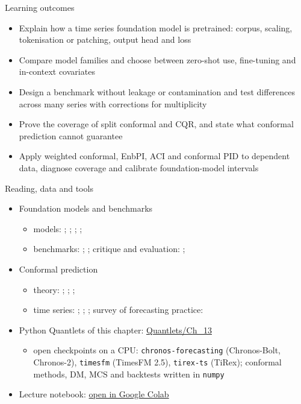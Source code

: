 \begin{frame}{Learning outcomes}
\itemsize{\small}
\begin{itemize}
    \item Explain how a time series foundation model is pretrained: corpus, scaling, tokenisation or patching, output head and loss
    \item Compare model families and choose between zero-shot use, fine-tuning and in-context covariates
    \item Design a benchmark without leakage or contamination and test differences across many series with corrections for multiplicity
    \item Prove the coverage of split conformal and CQR, and state what conformal prediction cannot guarantee
    \item Apply weighted conformal, EnbPI, ACI and conformal PID to dependent data, diagnose coverage and calibrate foundation-model intervals
\end{itemize}
\end{frame}

\begin{frame}{Reading, data and tools}
\itemsize{\small}
\begin{itemize}
    \item Foundation models and benchmarks
    \begin{itemize}
        \item models: ; ; ; ; 
        \item benchmarks: ; ; critique and evaluation: ; 
    \end{itemize}
    \item Conformal prediction
    \begin{itemize}
        \item theory: ; ; ; 
        \item time series: ; ; ; survey of forecasting practice: 
    \end{itemize}
    \item Python Quantlets of this chapter: \href{https://github.com/danpele/Advanced-Time-Series/tree/main/Quantlets/Ch_13}{Quantlets/Ch\_13}
    \begin{itemize}
        \item open checkpoints on a CPU: \texttt{chronos-forecasting} (Chronos-Bolt, Chronos-2), \texttt{timesfm} (TimesFM 2.5), \texttt{tirex-ts} (TiRex); conformal methods, DM, MCS and backtests written in \texttt{numpy}
    \end{itemize}
    \item Lecture notebook: \href{\colaburl{notebooks/EN/chapter13_lecture_notebook.ipynb}}{open in Google Colab}
\end{itemize}
\end{frame}

